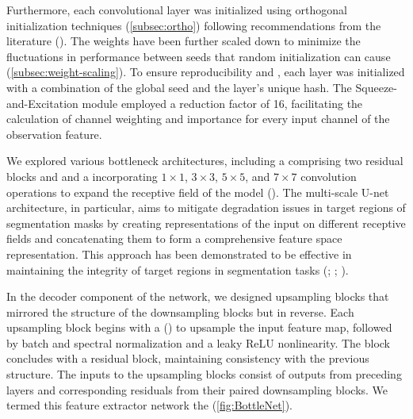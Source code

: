 \bigskip

\noindent Furthermore, each convolutional layer was initialized using orthogonal initialization techniques (\autoref{subsec:ortho}) following recommendations from the literature (\cite{shengyi2022the37implementation}). The weights have been further scaled down to minimize the fluctuations in performance between seeds that random initialization can cause (\autoref{subsec:weight-scaling}). To ensure reproducibility and , each layer was initialized with a combination of the global seed and the layer's unique hash. The Squeeze-and-Excitation module employed a reduction factor of 16, facilitating the calculation of channel weighting and importance for every input channel of the observation feature.

\bigskip

\noindent We explored various bottleneck architectures, including a  comprising two residual blocks and and a  incorporating $1\times1$, $3\times3$, $5\times5$, and $7\times7$ convolution operations to expand the receptive field of the model (\cite{Gao_2021}). The multi-scale U-net architecture, in particular, aims to mitigate degradation issues in target regions of segmentation masks by creating representations of the input on different receptive fields and concatenating them to form a comprehensive feature space representation. This approach has been demonstrated to be effective in maintaining the integrity of target regions in segmentation tasks (\cite{article_bot}; \cite{zhu2024efficient}; \cite{bhojanapalli2020lowrank}). 

\bigskip

\noindent In the decoder component of the network, we designed upsampling blocks that mirrored the structure of the downsampling blocks but in reverse. Each upsampling block begins with a  (\cite{shelhamer2016fully}) to upsample the input feature map, followed by batch and spectral normalization and a leaky ReLU nonlinearity. The block concludes with a residual block, maintaining consistency with the previous structure. The inputs to the upsampling blocks consist of outputs from preceding layers and corresponding residuals from their paired downsampling blocks. We termed this feature extractor network the  (\autoref{fig:BottleNet}).

\bigskip

